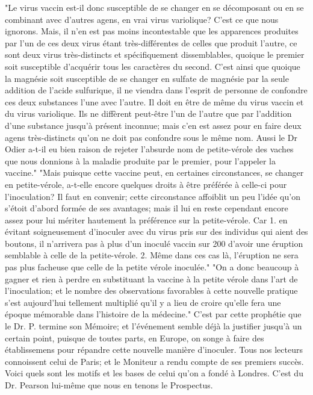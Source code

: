 "Le virus vaccin est-il donc susceptible de se changer en se décomposant ou en se combinant avec d'autres agens, en vrai virus variolique? C'est ce que nous ignorons. Mais, il n'en est pas moins incontestable que les apparences produites par l'un de ces deux virus étant très-différentes de celles que produit l'autre, ce sont deux virus très-distincts et spécifiquement dissemblables, quoique le premier soit susceptible d'acquérir tous les caractères du second. C'est ainsi que quoique\setcounter{page}{262} la magnésie soit susceptible de se changer en sulfate de magnésie par la seule addition de l'acide sulfurique, il ne viendra dans l'esprit de personne de confondre ces deux substances l'une avec l'autre. Il doit en être de même du virus vaccin et du virus variolique. Ils ne diffèrent peut-être l'un de l'autre que par l'addition d'une substance jusqu'à présent inconnue; mais c'en est assez pour en faire deux agens très-distincts qu'on ne doit pas confondre sous le même nom. Aussi le Dr Odier a-t-il eu bien raison de rejeter l'absurde nom de petite-vérole des vaches que nous donnions à la maladie produite par le premier, pour l'appeler la vaccine."
"Mais puisque cette vaccine peut, en certaines circonstances, se changer en petite-vérole, a-t-elle encore quelques droits à être préférée à celle-ci pour l'inoculation? Il faut en convenir; cette circonstance affoiblit un peu l'idée qu'on s'étoit d'abord formée de ses avantages; mais il lui en reste cependant encore assez pour lui mériter hautement la préférence sur la petite-vérole. Car 1. en évitant soigneusement d'inoculer avec du virus pris sur des individus qui aient des boutons, il n'arrivera pas à plus d'un inoculé vaccin sur 200 d'avoir une éruption semblable à celle de la petite-vérole. 2. Même dans ces cas\setcounter{page}{263} là, l'éruption ne sera pas plus facheuse que celle de la petite vérole inoculée."
"On a donc beaucoup à gagner et rien à perdre en substituant la vaccine à la petite vérole dans l'art de l'inoculation; et le nombre des observations favorables à cette nouvelle pratique s'est aujourd'hui tellement multiplié qu'il y a lieu de croire qu'elle fera une époque mémorable dans l'histoire de la médecine."
C'est par cette prophétie que le Dr. P. termine son Mémoire; et l'événement semble déjà la justifier jusqu'à un certain point, puisque de toutes parts, en Europe, on songe à faire des établissemens pour répandre cette nouvelle manière d'inoculer. Tous nos lecteurs connoissent celui de Paris; et le Moniteur a rendu compte de ses premiers succès.
Voici quels sont les motifs et les bases de celui qu'on a fondé à Londres. C'est du Dr. Pearson lui-même que nous en tenons le Prospectus.
